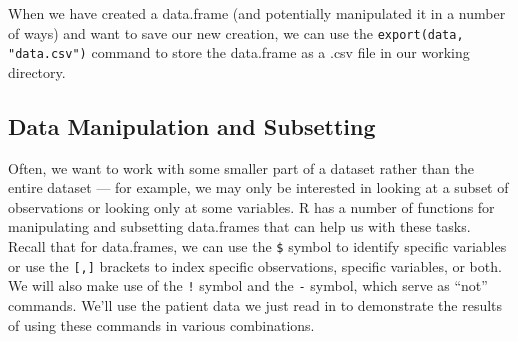 \documentclass[12pt]{article}\usepackage[]{graphicx}\usepackage[]{color}
\begin{document}
When we have created a data.frame (and potentially manipulated it in a number of ways) and want to save our new creation, we can use the \texttt{export(data, "data.csv")} command to store the data.frame as a .csv file in our working directory.

\subsection{Data Manipulation and Subsetting}
Often, we want to work with some smaller part of a dataset rather than the entire dataset --- for example, we may only be interested in looking at a subset of observations or looking only at some variables. R has a number of functions for manipulating and subsetting data.frames that can help us with these tasks. Recall that for data.frames, we can use the \texttt{\$} symbol to identify specific variables or use the \texttt{[,]} brackets to index specific observations, specific variables, or both. We will also make use of the \texttt{!} symbol and the \texttt{-} symbol, which serve as ``not'' commands. We'll use the patient data we just read in to demonstrate the results of using these commands in various combinations.
\end{document}
